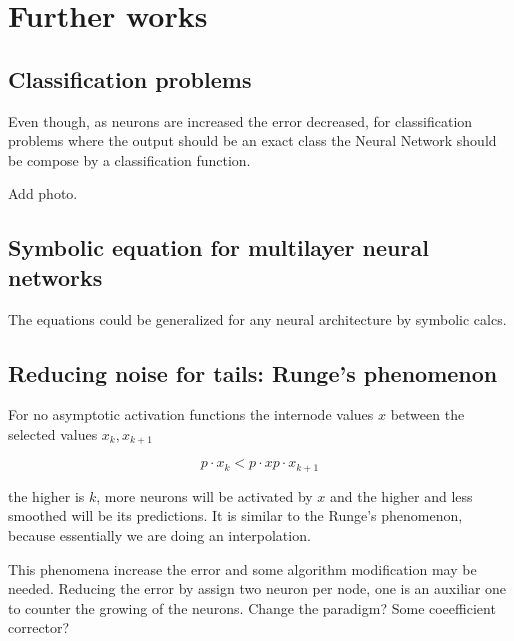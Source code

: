\section*{Further works}

\subsection*{Classification problems} 
Even though, as neurons are increased the error decreased,
for classification problems where the output should be an exact class the Neural Network should be compose by a classification function. 

Add photo. 


\subsection*{Symbolic equation for multilayer neural networks}

The equations could be generalized for any neural architecture by symbolic calcs. 

\subsection*{Reducing noise for tails: Runge's phenomenon}

For no asymptotic activation functions the internode values $x$ between the 
selected values $x_k, x_{k+1}$

\begin{equation}
    p \cdot x_k  
    < p \cdot x
    p \cdot x_{k+1} 
\end{equation}

the higher is $k$, more neurons will be activated  by $x$ and the higher and less smoothed will be its predictions. 
It is similar to the Runge's phenomenon, because essentially we are doing an interpolation. 

This phenomena increase the error and some algorithm modification may be needed. 
Reducing the error by assign two neuron per node, one is an auxiliar one to counter the 
growing of the neurons. 
Change the paradigm? Some coeefficient corrector?

